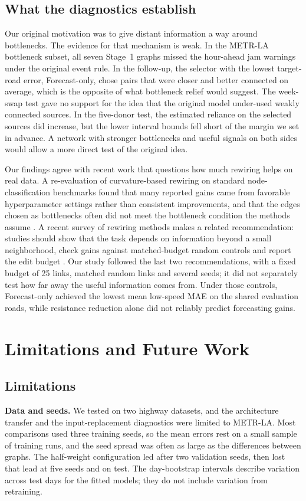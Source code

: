 \documentclass[journal]{IEEEtran}
\begin{document}
\subsection{What the diagnostics establish}
Our original motivation was to give distant information a way around bottlenecks. The evidence for that mechanism is weak. In the METR-LA bottleneck subset, all seven Stage~1 graphs missed the hour-ahead jam warnings under the original event rule. In the follow-up, the selector with the lowest target-road error, Forecast-only, chose pairs that were closer and better connected on average, which is the opposite of what bottleneck relief would suggest. The week-swap test gave no support for the idea that the original model under-used weakly connected sources. In the five-donor test, the estimated reliance on the selected sources did increase, but the lower interval bounds fell short of the margin we set in advance. A network with stronger bottlenecks and useful signals on both sides would allow a more direct test of the original idea.

Our findings agree with recent work that questions how much rewiring helps on real data. A re-evaluation of curvature-based rewiring on standard node-classification benchmarks found that many reported gains came from favorable hyperparameter settings rather than consistent improvements, and that the edges chosen as bottlenecks often did not meet the bottleneck condition the methods assume \cite{tori2025revisited}. A recent survey of rewiring methods makes a related recommendation: studies should show that the task depends on information beyond a small neighborhood, check gains against matched-budget random controls and report the edit budget \cite{attali2026survey}. Our study followed the last two recommendations, with a fixed budget of 25 links, matched random links and several seeds; it did not separately test how far away the useful information comes from. Under those controls, Forecast-only achieved the lowest mean low-speed MAE on the shared evaluation roads, while resistance reduction alone did not reliably predict forecasting gains.

\section{Limitations and Future Work}\label{sec:limitations}
\subsection{Limitations}
\textbf{Data and seeds.} We tested on two highway datasets, and the architecture transfer and the input-replacement diagnostics were limited to METR-LA. Most comparisons used three training seeds, so the mean errors rest on a small sample of training runs, and the seed spread was often as large as the differences between graphs. The half-weight configuration led after two validation seeds, then lost that lead at five seeds and on test. The day-bootstrap intervals describe variation across test days for the fitted models; they do not include variation from retraining.
\end{document}
